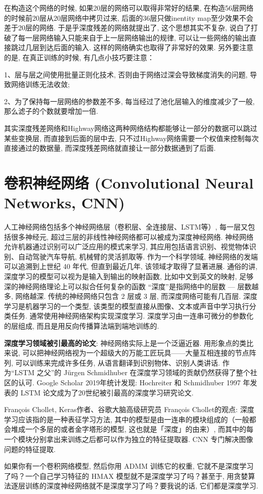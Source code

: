 在构造这个网络的时候, 如果20层的网络可以取得非常好的结果, 在构造56层网络的时候前20层从20层网络中拷贝过来, 后面的36层只做inentity map至少效果不会差于20层的网络.
于是乎深度残差的网络就提出了, 这个思想其实不复杂, 说白了打破了每一层网络输入只能来自于上一层网络输出的规律, 可以让一些网络的输出直接跳过几层到达后面的输入.
这样的网络确实也取得了非常好的效果. 另外要注意的是, 在真正训练的时候, 有几点小技巧要注意：

1、层与层之间使用批量正则化技术, 否则由于网络过深会导致梯度消失的问题, 导致网络训练无法收敛;

2、为了保持每一层网络的参数差不多, 每当经过了池化层输入的维度减少了一般, 那么滤子的个数就要增加一倍.

其实深度残差网络和Highway网络这两种网络结构都能够让一部分的数据可以跳过某些变换层, 而直接到后面的层中去, 只不过Highway网络需要一个权值来控制每次直接通过的数据量, 而深度残差网络就直接让一部分数据通到了后面.
\section{卷积神经网络 (Convolutional Neural Networks, CNN)}
人工神经网络包括多个神经网络层（卷积层、全连接层、LSTM等）, 每一层又包括很多神经元, 超过三层的非线性神经网络都可以被成为深度神经网络.
神经网络允许机器通过识别可以广泛应用的模式来学习, 其应用包括语言识别、视觉物体识别、自动驾驶汽车导航, 机械臂的灵活抓取等. 作为一个科学领域, 神经网络的发端可以追溯到上世纪 40 年代, 但直到最近几年, 该领域才取得了显著进展.
通俗的讲, 深度学习的模型可以视为是输入到输出的映射函数, 比如中文到英文的映射, 足够深的神经网络理论上可以拟合任何复杂的函数
“深度”是指网络中的层数 — 层数越多, 网络越深. 传统的神经网络只包含 2 层或 3 层, 而深度网络可能有几百层.
深度学习是机器学习的一个类型, 该类型的模型直接从图像、文本或声音中学习执行分类任务. 通常使用神经网络架构实现深度学习.
深度学习由一连串可微分的参数化的层组成, 而且是用反向传播算法端到端地训练的.
\begin{remark}
\textbf{深度学习领域被引最高的论文}:
神经网络实际上是一个泛逼近器. 用形象点的类比来说, 可以把神经网络视为一个超级大的万能工匠玩具——大量互相连接的节点阵列, 可以训练来完成许多任务, 从语言翻译到识别物体、识别人类讲话.
作为“LSTM 之父”的 Jürgen Schmidhuber 在深度学习领域的贡献仍然获得了整个社区的认可.
Google Scholar 2019年统计发现:  Hochreiter 和 Schmidhuber 1997 年发表的 LSTM 论文成为了20世纪被引最高的深度学习研究论文\cite{HochreiterNC1997}.
\end{remark}

François Chollet, Keras作者、谷歌大脑高级研究员 François Chollet的观点: 深度学习应该指的是一种表征学习方法, 其中的模型是由一连串的模块组成的（一般都会堆成一个多层的或者金字塔形的模型, 这也就是「深度」的由来）, 而其中的每一个模块分别拿出来训练之后都可以作为独立的特征提取器. CNN 专门解决图像问题的特征提取.
\begin{example}
  如果你有一个卷积网络模型, 然后你用 ADMM 训练它的权重, 它就不是深度学习了吗？一个自己学习特征的 HMAX 模型就不是深度学习了吗？甚至于, 用贪婪算法逐层训练的深度神经网络就不是深度学习了吗？要我说的话, 它们都是深度学习.
\end{example}

